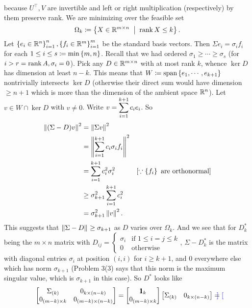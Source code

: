 \begin{enumerate}[leftmargin=*]
because $U^\top, V$ are invertible and left or right multiplication (respectively) by them preserve rank. We are minimizing over the feasible set $$\Omega_k \sett \set{X\in \R^{m\times n}\st \rk X \leq k}.$$ Let $\set{e_i\in\R^n}_{i=1}^n, \set{f_i\in\R^m}_{i=1}^m$ be the standard basis vectors. Then $\Sigma e_i = \sigma_if_i$ for each $ 1\leq i\leq s\sett\min\set{m,n}$. Recall that we had ordered $\sigma_1\geq \cdots\geq \sigma_s$ (for $i>r=\rk A, \sigma_i=0$). Pick any $D\in\R^{m\times n}$ with at most rank $k$, whence $\ker D$ has dimension at least $n-k$. This means that $W\sett \text{span}\set{e_1,\cdots,e_{k+1}}$ nontrivially intersects $\ker D$ (otherwise their direct sum would have dimension $\geq n+1$ which is more than the dimension of the ambient space $\R^n$). Let $v\in W\cap\ker D$ with $v\neq 0$. Write $\ds v=\sum_{i=1}^{k+1}c_i e_i$. So \begin{align*}
\left\lVert (\Sigma-D)v \right\rVert_{}^2 &= \left\lVert \Sigma v \right\rVert_{}^2 \\
&= \left\lVert \sum_{i=1}^{k+1}c_i\sigma_i f_i \right\rVert_{}^2 \\
&= \sum_{i=1}^{k+1}c_i^2\sigma_i^2 & [\because \left\{f_i\right\} \text{ are orthonormal}]\\
&\geq \sigma_{k+1}^2 \sum_{i=1}^{k+1}c_i^2\\&=\sigma_{k+1}^2\left\lVert v \right\rVert_{}^2.
\end{align*}
This suggests that $\norm{\Sigma-D}{}\geq \sigma_{k+1}$ as $D$ varies over $\Omega_k$. And we see that for $D_k^*$ being the $m\times n$ matrix with $D_{ij}=\begin{cases} \sigma_i&\text{if } 1\leq i=j\leq k\\0&\text{otherwise}
\end{cases}$, $\Sigma-D_k^*$ is the matrix with diagonal entries $\sigma_i$ at position $(i,i)$ for $i\geq k+1$, and $0$ everywhere else which has norm $\sigma_{k+1}$ (Problem 3(3) says that this norm is the maximum singular value, which is $\sigma_{k+1}$ in this case). So $D^*$ looks like $$ \begin{bmatrix}
\Sigma_{(k)} & 0_{k\times(n-k)}\\0_{(m-k)\times k}&0_{(m-k)\times(n-k)}
\end{bmatrix}=
\begin{bmatrix}
\pmb 1_{k} \\0_{(m-k)\times k}
\end{bmatrix}
\begin{bmatrix}
\Sigma_{(k)} & 0_{k\times(n-k)}
\end{bmatrix}
={\color{blue}\begin{bmatrix}

\end{bmatrix}}$$
\end{enumerate}
